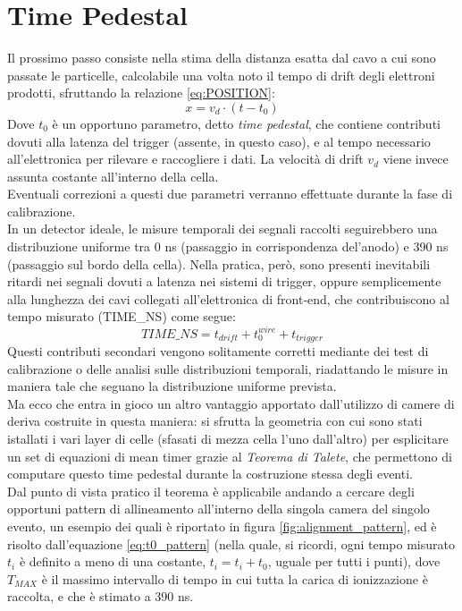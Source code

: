 \documentclass[a4paper,11pt]{book}
\begin{document}
\section{Time Pedestal}

Il prossimo passo consiste nella stima della distanza esatta dal cavo a cui sono passate le particelle, calcolabile una volta noto il tempo di drift degli elettroni prodotti, sfruttando la relazione \ref{eq:POSITION}:
\begin{equation}
x = v_d\cdot(t-t_0)
\label{eq:POSITION}
\end{equation}
Dove $t_0$ è un opportuno parametro, detto \textit{time pedestal}, che contiene contributi dovuti alla latenza del trigger (assente, in questo caso), e al tempo necessario all'elettronica per rilevare e raccogliere i dati.  La velocità di drift $v_d$ viene invece assunta costante all'interno della cella.\\
Eventuali correzioni a questi due parametri verranno effettuate durante la fase di calibrazione.\\

In un detector ideale, le misure temporali dei segnali raccolti seguirebbero una distribuzione uniforme tra 0 ns (passaggio in corrispondenza del'anodo) e 390 ns (passaggio sul bordo della cella). Nella pratica, però, sono presenti inevitabili ritardi nei segnali dovuti a latenza nei sistemi di trigger, oppure semplicemente alla lunghezza dei cavi collegati all'elettronica di front-end, che contribuiscono al tempo misurato (TIME\_NS) come segue:
\[ TIME\_NS = t_{drift} + t_0^{wire} + t_{trigger} \]
Questi contributi secondari vengono solitamente corretti mediante dei test di calibrazione o delle analisi sulle distribuzioni temporali, riadattando le misure in maniera tale che seguano la distribuzione uniforme prevista.\\

Ma ecco che entra in gioco un altro vantaggio apportato dall'utilizzo di camere di deriva costruite in questa maniera: si sfrutta la geometria con cui sono stati istallati i vari layer di celle (sfasati di mezza cella l'uno dall'altro) per esplicitare un set di equazioni di mean timer grazie al \textit{Teorema di Talete}, che permettono di computare questo time pedestal durante la costruzione stessa degli eventi. \\
Dal punto di vista pratico il teorema è applicabile andando a cercare degli opportuni pattern di allineamento all'interno della singola camera del singolo evento, un esempio dei quali è riportato in figura \ref{fig:alignment_pattern}, ed è risolto dall'equazione \ref{eq:t0_pattern} (nella quale, si ricordi, ogni tempo misurato $t_i$ è definito a meno di una costante, $t_i = t_i + t_0$, uguale per tutti i punti), dove $T_{MAX}$ è il massimo intervallo di tempo in cui tutta la carica di ionizzazione è raccolta, e che è  stimato a 390 ns.
\end{document}
